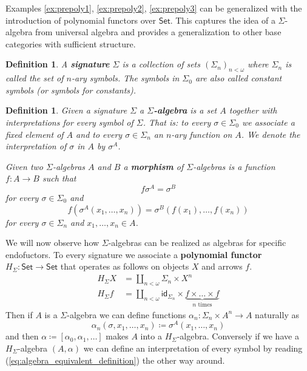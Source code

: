 \documentclass[letterpaper, 11pt, oneside]{memoir}
\theoremstyle{myteo}
\newtheorem{definition}[theorem]{Definition}
\numberwithin{equation}{section}
\newcommand{\marginnote}[1]{\marginpar{\footnotesize #1}}
\newcommand{\id}{\textsf{id}}
\newcommand{\Set}{\textsf{Set}}
\begin{document}
Examples \ref{ex:prepoly1}, \ref{ex:prepoly2}, \ref{ex:prepoly3} can be generalized with the introduction of polynomial functors over \(\Set\).
This captures the idea of a \(\Sigma\)-algebra from universal algebra and provides a generalization to other base categories with sufficient structure.

\begin{definition}
  A \textbf{signature} \(\Sigma\) is a collection of sets \((\Sigma_n)_{n < \omega}\) where \(\Sigma_n\) is called the set of \(n\)-ary symbols.
  \marginnote{signature}
  The symbols in \(\Sigma_0\) are also called constant symbols (or symbols for constants).
\end{definition}

\begin{definition}
  \label{def:sigma-algebra}
  Given a signature \(\Sigma\) a \textbf{\(\Sigma\)-algebra} is a set \(A\) together with interpretations for every symbol of \(\Sigma\).
  \marginnote{\(\Sigma\)-algebra}
  That is: to every \(\sigma \in \Sigma_0\) we associate a fixed element of \(A\) and to every \(\sigma \in \Sigma_n\) an \(n\)-ary function on \(A\).
  We denote the interpretation of \(\sigma\) in \(A\) by \(\sigma^A\).

  Given two \(\Sigma\)-algebras \(A\) and \(B\) a \textbf{morphism} of \(\Sigma\)-algebras is a function \(f \colon A \to B\) such that
  \begin{equation}
    \label{eq:sigma_morphism_condition1}
    f\sigma^A = \sigma ^B
  \end{equation}
  for every \(\sigma \in \Sigma_0\) and
  \begin{equation}
    \label{eq:sigma_morphism_condition2}
    f(\sigma^A(x_1, \ldots, x_n)) = \sigma^B(f(x_1), \ldots, f(x_n))
  \end{equation}
  for every \(\sigma \in \Sigma_n\) and \(x_1, \ldots, x_n \in A\).
\end{definition}

We will now observe how \(\Sigma\)-algebras can be realized as algebras for specific endofuctors.
To every signature we associate a \textbf{polynomial functor} \marginnote{polynomial functor} \(H_\Sigma \colon \Set \to \Set\) that operates as follows on objects \(X\) and arrows \(f\).
\begin{align*}
  H_\Sigma X &= \coprod_{n < \omega} \Sigma_n \times X^n \\
  H_\Sigma f &= \coprod_{n < \omega} \id_{\Sigma_n} \times \underbrace{f \times \ldots \times f}_{\text{\(n\) times}}
\end{align*}
Then if \(A\) is a \(\Sigma\)-algebra we can define functions \(\alpha_n \colon \Sigma_n \times A^n \to A\) naturally as
\begin{equation}
  \label{eq:algebra_equivalent_definition}
  \alpha_n(\sigma, x_1, \ldots, x_n) \coloneqq \sigma^A(x_1, \ldots, x_n)
\end{equation}
and then \(\alpha \coloneqq \left[\alpha_0, \alpha_1, \ldots \right]\) makes \(A\) into a \(H_\Sigma\)-algebra.
Conversely if we have a \(H_\Sigma\)-algebra \((A, \alpha)\) we can define an interpretation of every symbol by reading (\ref{eq:algebra_equivalent_definition}) the other way around.
\end{document}
